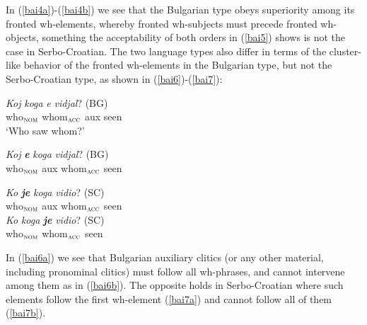 \documentclass[output=paper,colorlinks,citecolor=brown,
]{langscibook}
\begin{document}
In (\ref{bai4a})-(\ref{bai4b}) we see that the Bulgarian type obeys superiority among its fronted wh-elements, whereby fronted wh-subjects must precede fronted wh-objects, something the acceptability of both orders in (\ref{bai5}) shows is not the case in Serbo-Croatian. The two language types also differ in terms of the cluster-like behavior of the fronted wh-elements in the Bulgarian type, but not the Serbo-Croatian type, as shown in (\ref{bai6})-(\ref{bai7}):

\begin{exe}
\ex \label{bai6}
\begin{xlist}
\ex \label{bai6a}
\gll \emph{Koj}		\emph{koga}	\emph{e}	\emph{vidjal}? \hfill (BG) \\
who$_{\textsc{nom}}$ whom$_{\textsc{acc}}$ aux seen\\
\glt `Who saw whom?'

\ex \label{bai6b}
\gll *\emph{Koj}	\textbf{\emph{e}}	\emph{koga}		\emph{vidjal}? \hfill (BG) \\
who$_{\textsc{nom}}$ aux whom$_{\textsc{acc}}$ seen\\
\end{xlist}
\end{exe}

\begin{exe}
\ex \label{bai7}
\begin{xlist}
\ex \label{bai7a}
\gll \emph{Ko}	\emph{\textbf{je}} \emph{koga}		\emph{vidio}? \hfill(SC) \\
who$_{\textsc{nom}}$ aux whom$_{\textsc{acc}}$ seen\\

\ex \label{bai7b}
\gll *\emph{Ko}		\emph{koga}	 \emph{\textbf{je}}	\emph{vidio}? \hfill(SC) \\
who$_{\textsc{nom}}$ whom$_{\textsc{acc}}$ seen\\
\end{xlist}
\end{exe}

In (\ref{bai6a}) we see that Bulgarian auxiliary clitics (or any other material, including pronominal clitics) must follow all wh-phrases, and cannot intervene among them as in (\ref{bai6b}). The opposite holds in Serbo-Croatian where such elements follow the first wh-element (\ref{bai7a}) and cannot follow all of them (\ref{bai7b}). 
\end{document}
